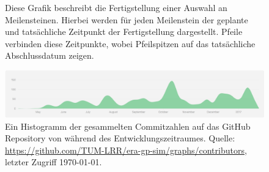 \begin{figure}[t!]
  \centering
  \caption{Diese Grafik beschreibt die Fertigstellung einer Auswahl an Meilensteinen. Hierbei werden für jeden Meilenstein der geplante und tatsächliche Zeitpunkt der Fertigstellung dargestellt. Pfeile verbinden diese Zeitpunkte, wobei Pfeilspitzen auf das tatsächliche Abschlussdatum zeigen.}
  \label{fig:time-frame}
\end{figure}

\begin{figure}[b!]
  \centering
  \includegraphics[scale=0.45]{figures/commit-history}
  \caption{Ein Histogramm der gesammelten Commitzahlen auf das GitHub Repository von \erasim{} während des Entwicklungszeitraumes. Quelle: {\small\url{https://github.com/TUM-LRR/era-gp-sim/graphs/contributors}}, letzter Zugriff \today.}
  \label{fig:commit-history}
\end{figure}

